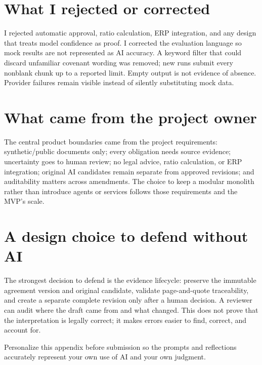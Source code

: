 \documentclass[10pt]{article}
\newcommand{\smallnote}[1]{\textcolor{muted}{\small #1}}
\begin{document}
\section{What I rejected or corrected}
I rejected automatic approval, ratio calculation, ERP integration, and any design that treats model confidence as proof. I corrected the evaluation language so mock results are not represented as AI accuracy. A keyword filter that could discard unfamiliar covenant wording was removed; new runs submit every nonblank chunk up to a reported limit. Empty output is not evidence of absence. Provider failures remain visible instead of silently substituting mock data.

\section{What came from the project owner}
The central product boundaries came from the project requirements: synthetic/public documents only; every obligation needs source evidence; uncertainty goes to human review; no legal advice, ratio calculation, or ERP integration; original AI candidates remain separate from approved revisions; and auditability matters across amendments. The choice to keep a modular monolith rather than introduce agents or services follows those requirements and the MVP's scale.

\section{A design choice to defend without AI}
The strongest decision to defend is the evidence lifecycle: preserve the immutable agreement version and original candidate, validate page-and-quote traceability, and create a separate complete revision only after a human decision. A reviewer can audit where the draft came from and what changed. This does not prove that the interpretation is legally correct; it makes errors easier to find, correct, and account for.

\vfill
\smallnote{Personalize this appendix before submission so the prompts and reflections accurately represent your own use of AI and your own judgment.}
\end{document}
